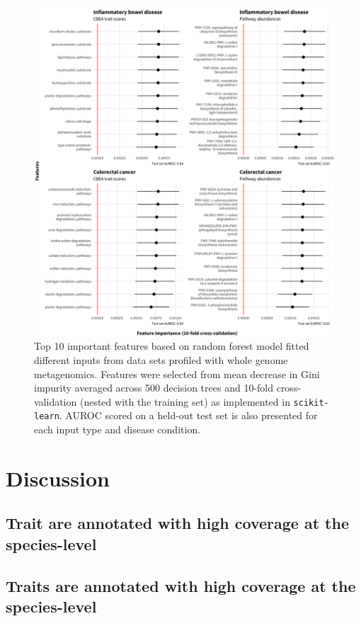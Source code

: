 \documentclass{bmcart}
\begin{document}
\begin{figure}[!h]
\includegraphics[width=0.99\linewidth]{figures/feat_importance_wgs.png}
\caption{Top 10 important features based on random forest model fitted different inputs from data sets profiled with whole genome metagenomics. Features were selected from mean decrease in Gini impurity averaged across 500 decision trees and 10-fold cross-validation (nested with the training set) as implemented in \texttt{scikit-learn}. AUROC scored on a held-out test set is also presented for each input type and disease condition.}
\label{fig:4}
\end{figure}

\section*{Discussion}
\subsection*{Trait are annotated with high coverage at the species-level}

\subsection*{Traits are annotated with high coverage at the species-level}
\end{document}
